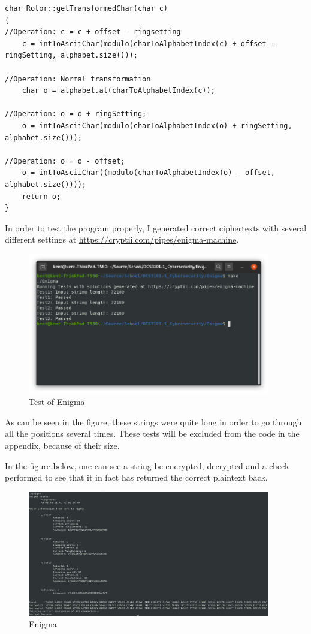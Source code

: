 \documentclass{article}
\begin{document}
\begin{lstlisting}
char Rotor::getTransformedChar(char c)
{
//Operation: c = c + offset - ringsetting
	c = intToAsciiChar(modulo(charToAlphabetIndex(c) + offset - ringSetting, alphabet.size()));

//Operation: Normal transformation
	char o = alphabet.at(charToAlphabetIndex(c));

//Operation: o = o + ringSetting;
	o = intToAsciiChar(modulo(charToAlphabetIndex(o) + ringSetting, alphabet.size()));

//Operation: o = o - offset;
	o = intToAsciiChar((modulo(charToAlphabetIndex(o) - offset, alphabet.size())));
	return o;
}
\end{lstlisting}



In order to test the program properly, I generated correct ciphertexts with several different settings at \url{https://cryptii.com/pipes/enigma-machine}.
\begin{figure}[H]
 \centering
  \includegraphics[width=300pt]{img/enigmaTest.png}
 \caption{Test of Enigma}
 \end{figure}
As can be seen in the figure, these strings were quite long in order to go through all the positions several times. These tests will be excluded from the code in the appendix, because of their size.


In the figure below, one can see a string be encrypted, decrypted and a check performed to see that it in fact has returned the correct plaintext back.
\begin{figure}[H]
 \centering
  \includegraphics[width=300pt]{img/enigmaMan.png}
 \caption{Enigma}
 \end{figure}
\end{document}
